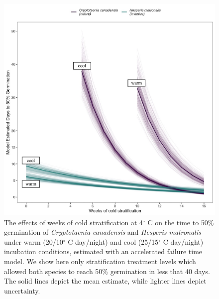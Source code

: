 \documentclass{article}[11pt]
\begin{document}
\begin{figure}[h!]
    \centering
          \includegraphics[width=\textwidth]{..//figure/AFTsivansive.jpeg}
   
\caption{The effects of weeks of cold stratification at 4$^{\circ}$ C on the time to 50\% germination of \textit {Cryptotaenia canadensis} and \textit{Hesperis matronalis} under warm (20/10$^{\circ}$ C day/night) and cool (25/15$^{\circ}$ C day/night) incubation conditions, estimated with an accelerated failure time model. We show here only stratification treatment levels which allowed both species to reach 50\% germination in less that 40 days. The solid lines depict the mean estimate, while lighter lines depict uncertainty.}
    \label{fig:aft}
\end{figure}
\end{document}
